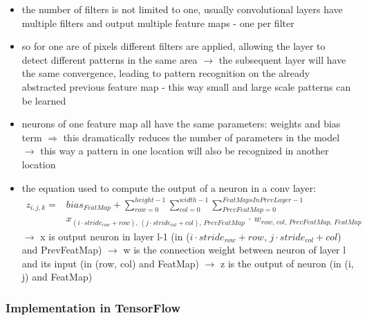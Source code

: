 \documentclass[12pt,a4paper]{article}
\begin{document}
\begin{itemize}
  \item the number of filters is not limited to one, usually convolutional layers have multiple filters and output multiple feature maps - one per filter
  \item so for one are of pixels different filters are applied, allowing the layer to detect different patterns in the same area
  \newline \indent $\longrightarrow$ the subsequent layer will have the same convergence, leading to pattern recognition on the already abstracted previous feature map - this way small and large scale patterns can be learned
  \item neurons of one feature map all have the same parameters: weights and bias term $\Longrightarrow$ this dramatically reduces the number of parameters in the model
  \newline \indent $\longrightarrow$ this way a pattern in one location will also be recognized in another location
  \item the equation used to compute the output of a neuron in a conv layer:
  \begin{align}
    z_{i, j, k} = &bias_{FeatMap} + \sum^{height-1}_{row=0} \sum^{width-1}_{col=0} \sum^{FeatMapsInPrevLayer-1}_{PrevFeatMap=0}&&  \nonumber \\ 
    &x_{(i\cdot stride_{row} + row), \,(j\cdot stride_{col} + col), \,PrevFeatMap} \, \cdot  \, w_{row, \,col, \, PrevFeatMap, \,FeatMap} &&
  \end{align}
  \newline \indent $\longrightarrow$ x is output neuron in layer l-1 (in ($i\cdot stride_{row} + row, \,j\cdot stride_{col} + col$) and PrevFeatMap)
  \newline \indent $\longrightarrow$ w is the connection weight between neuron of layer l and its input (in (row, col) and FeatMap) 
  \newline \indent $\longrightarrow$ z is the output of neuron (in (i, j) and FeatMap)
\end{itemize}
\subsubsection{Implementation in TensorFlow} %
\label{ssub:implementation_in_tensorflow}

\end{document}
